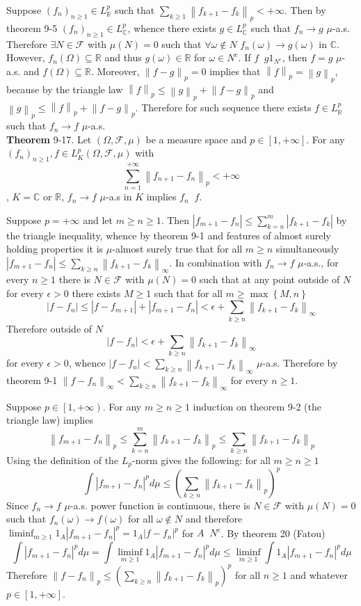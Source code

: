 \documentclass[a4paper]{article}
\newcommand{\obj}[1]{\left\{ #1 \right \}}
\newcommand{\clo}[1]{\left [ #1 \right ]}
\newcommand{\clop}[1]{\left [ #1 \right )}
\newcommand{\brac}[1]{\left ( #1 \right )}
\newcommand{\abs}[1]{\left | #1 \right |}
\newcommand{\nrm}[1]{\left\| #1 \right \|}
\newcommand{\Real}{\mathbb{R}}
\newcommand{\Cplx}{\mathbb{C}}
\newcommand{\Fcal}{\mathcal{F}}
\newcommand{\defn}{\mathop{\overset{\Delta}{=}}\nolimits}
\newcommand{\lpto}{\mathop{\overset{L^p}{\to}}\nolimits}
\begin{document}
Suppose $\brac{f_n}_{n\geq 1}\in L^p_\Real$ such that $\sum_{k\geq 1} \nrm{f_{k+1}-f_k}_p<+\infty$. Then by theorem 9-5 $\brac{f_n}_{n\geq 1}\in L^p_\Cplx$, whence there exists $g\in L^p_\Cplx$ such that $f_n\to g$ $\mu$-a.s. Therefore $\exists N\in \Fcal$ with $\mu\brac{N}=0$ such that $\forall \omega\notin N$ $f_n\brac{\omega}\to g\brac{\omega}$ in $\Cplx$. However, $f_n\brac{\Omega}\subseteq \Real$ and thus $g\brac{\omega}\in \Real$ for $\omega\in N^c$. If $f\defn g 1_{N^c}$, then $f=g$ $\mu$-a.s. and $f\brac{\Omega}\subseteq \Real$. Moreover, $\nrm{f-g}_p=0$ implies that $\nrm{f}_p=\nrm{g}_p$, because by the triangle law $\nrm{f}_p\leq \nrm{g}_p+\nrm{f-g}_p$ and $\nrm{g}_p\leq \nrm{f}_p+\nrm{f-g}_p$. Therefore for such sequence there exists $f\in L^p_\Real$ such that $f_n\to f$ $\mu$-a.s.\\

\label{thm:muas_lpto} \noindent \textbf{Theorem} 9-17.
Let $\brac{\Omega, \Fcal, \mu}$ be a measure space and $p\in \clo{1,+\infty}$. For any $\brac{f_n}_{n\geq 1}, f\in L^p_K\brac{\Omega, \Fcal, \mu}$ with \[\sum_{n=1}^{+\infty} \nrm{f_{n+1}-f_n}_p < +\infty\], $K=\Cplx$ or $\Real$, $f_n\to f$ $\mu$-a.s in $K$ implies $f_n\lpto f$.

Suppose $p=+\infty$ and let $m\geq n\geq 1$. Then $\abs{f_{m+1}-f_n}\leq \sum_{k=n}^m \abs{f_{k+1}-f_k}$ by the triangle inequality, whence by theorem 9-1 and features of almost surely holding properties it is $\mu$-almost surely true that for all $m\geq n$ simultaneously $\abs{f_{m+1}-f_n}\leq \sum_{k\geq n} \nrm{f_{k+1}-f_k}_\infty$. In combination with $f_n\to f$ $\mu$-a.s., for every $n\geq 1$ there is $N\in \Fcal$ with $\mu\brac{N}=0$ such that at any point outside of $N$ for every $\epsilon>0$ there exists $M\geq 1$ such that for all $m\geq \max\obj{M,n}$ \[\abs{f-f_n} \leq \abs{f-f_{m+1}} + \abs{f_{m+1}-f_n} < \epsilon + \sum_{k\geq n} \nrm{f_{k+1}-f_k}_\infty\] Therefore outside of $N$ \[\abs{f-f_n} < \epsilon + \sum_{k\geq n} \nrm{f_{k+1}-f_k}_\infty\] for every $\epsilon>0$, whence $\abs{f-f_n} < \sum_{k\geq n} \nrm{f_{k+1}-f_k}_\infty$ $\mu$-a.s. Therefore by theorem 9-1 $\nrm{f-f_n}_\infty < \sum_{k\geq n} \nrm{f_{k+1}-f_k}_\infty$ for every $n\geq 1$.

Suppose $p\in \clop{1,+\infty}$. For any $m\geq n\geq 1$ induction on theorem 9-2 (the triangle law) implies \[\nrm{f_{m+1}-f_n}_p\leq \sum_{k=n}^m \nrm{f_{k+1}-f_k}_p\leq \sum_{k\geq n} \nrm{f_{k+1}-f_k}_p\] Using the definition of the $L_p$-norm gives the following: for all $m\geq n\geq 1$ \[\int \abs{f_{m+1}-f_n}^p d\mu \leq \brac{\sum_{k\geq n} \nrm{f_{k+1}-f_k}_p}^p\] Since $f_n\to f$ $\mu$-a.s. power function is continuous, there is $N\in \Fcal$ with $\mu\brac{N}=0$ such that $f_n\brac{\omega}\to f\brac{\omega}$ for all $\omega\notin N$ and therefore $\liminf_{m\geq 1} 1_A \abs{f_{m+1}-f_n}^p = 1_A \abs{f-f_n}^p$ for $A\defn N^c$. By theorem 20 (Fatou) \[ \int \abs{f_{m+1}-f_n}^p d\mu = \int \liminf_{m\geq 1} 1_A \abs{f_{m+1}-f_n}^p d\mu \leq \liminf_{m\geq 1} \int 1_A \abs{f_{m+1}-f_n}^p d\mu\] Therefore $\nrm{f-f_n}_p \leq \brac{\sum_{k\geq n} \nrm{f_{k+1}-f_k}_p}^p$ for all $n\geq 1$ and whatever $p\in \clo{1,+\infty}$.
\end{document}
